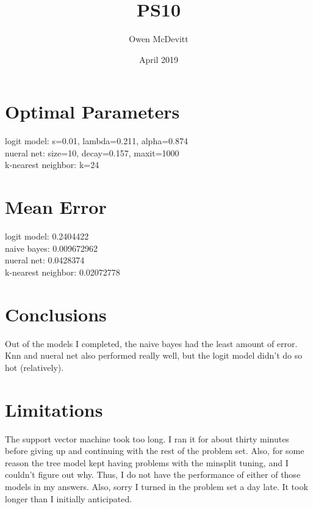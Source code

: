 \documentclass{article}
\title{PS10}
\author{Owen McDevitt}
\date{April 2019}
\begin{document}
\maketitle

\section {Optimal Parameters}

logit model: s=0.01, lambda=0.211, alpha=0.874
\\
nueral net: size=10, decay=0.157, maxit=1000
\\
k-nearest neighbor: k=24

\section {Mean Error}

logit model: 0.2404422
\\
naive bayes: 0.009672962
\\
nueral net: 0.0428374
\\
k-nearest neighbor: 0.02072778

\section{Conclusions}

Out of the models I completed, the naive bayes had the least amount of error. Knn and nueral net also performed really well, but the logit model didn't do so hot (relatively).

\section{Limitations}

The support vector machine took too long. I ran it for about thirty minutes before giving up and continuing with the rest of the problem set. Also, for some reason the tree model kept having problems with the minsplit tuning, and I couldn't figure out why. Thus, I do not have the performance of either of those models in my answers. Also, sorry I turned in the problem set a day late. It took longer than I initially anticipated.
\end{document}
